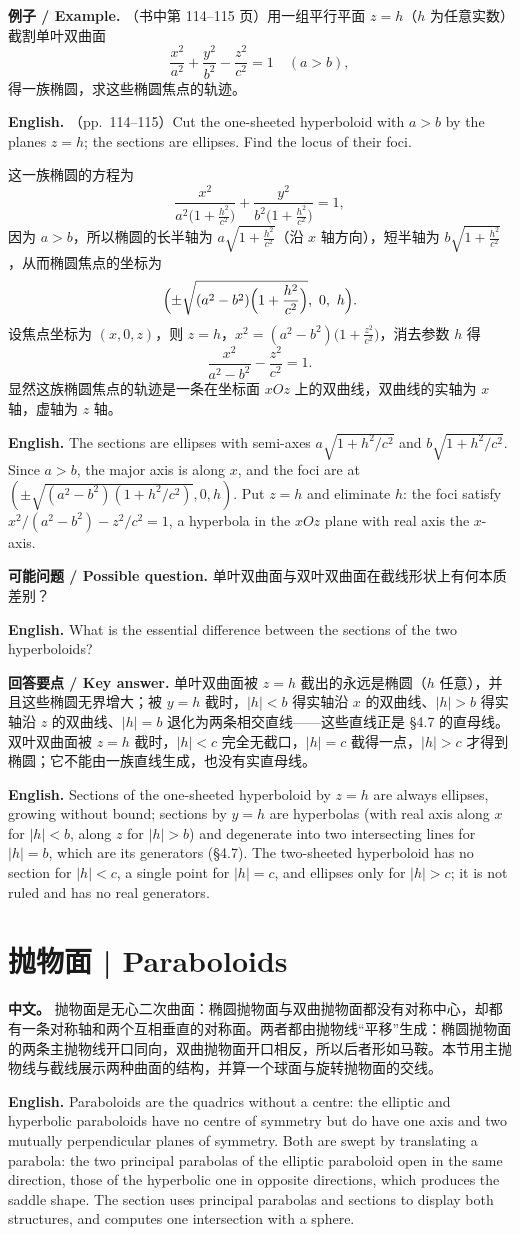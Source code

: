 \documentclass[UTF8,11pt,a4paper]{ctexart}
\newcommand{\APS}[2]{\par\noindent\textbf{中文。} #1\par\noindent\textbf{English.} #2\par\smallskip}
\newcommand{\EN}[1]{\par\noindent \textbf{English.} #1\par}
\newcommand{\EX}[2]{\par\noindent \textbf{例子 / Example.} #1\par\EN{#2}}
\newcommand{\ASK}[4]{\par\noindent \textbf{可能问题 / Possible question.} #1\par\EN{#2}\noindent \textbf{回答要点 / Key answer.} #3\par\EN{#4}\medskip}
\theoremstyle{definition}
\begin{document}
\EX{（书中第 114--115 页）用一组平行平面 $z=h$（$h$ 为任意实数）截割单叶双曲面
\[
\frac{x^2}{a^2}+\frac{y^2}{b^2}-\frac{z^2}{c^2}=1\quad(a>b),
\]
得一族椭圆，求这些椭圆焦点的轨迹。}{（pp.~114--115）Cut the one-sheeted hyperboloid with $a>b$ by the planes $z=h$; the sections are ellipses. Find the locus of their foci.}
这一族椭圆的方程为
\[
\frac{x^2}{a^2\bigl(1+\frac{h^2}{c^2}\bigr)}+\frac{y^2}{b^2\bigl(1+\frac{h^2}{c^2}\bigr)}=1,
\]
因为 $a>b$，所以椭圆的长半轴为 $a\sqrt{1+\frac{h^2}{c^2}}$（沿 $x$ 轴方向），短半轴为 $b\sqrt{1+\frac{h^2}{c^2}}$，从而椭圆焦点的坐标为
\[
\Bigl(\pm\sqrt{(a^2-b^2)\Bigl(1+\frac{h^2}{c^2}\Bigr)},\ 0,\ h\Bigr).
\]
设焦点坐标为 $(x,0,z)$，则 $z=h$，$x^2=(a^2-b^2)\bigl(1+\frac{z^2}{c^2}\bigr)$，消去参数 $h$ 得
\[
\frac{x^2}{a^2-b^2}-\frac{z^2}{c^2}=1.
\]
显然这族椭圆焦点的轨迹是一条在坐标面 $xOz$ 上的双曲线，双曲线的实轴为 $x$ 轴，虚轴为 $z$ 轴。
\EN{The sections are ellipses with semi-axes $a\sqrt{1+h^2/c^2}$ and $b\sqrt{1+h^2/c^2}$. Since $a>b$, the major axis is along $x$, and the foci are at $(\pm\sqrt{(a^2-b^2)(1+h^2/c^2)},0,h)$. Put $z=h$ and eliminate $h$: the foci satisfy $x^2/(a^2-b^2)-z^2/c^2=1$, a hyperbola in the $xOz$ plane with real axis the $x$-axis.}

\ASK{单叶双曲面与双叶双曲面在截线形状上有何本质差别？}{What is the essential difference between the sections of the two hyperboloids?}{单叶双曲面被 $z=h$ 截出的永远是椭圆（$h$ 任意），并且这些椭圆无界增大；被 $y=h$ 截时，$|h|<b$ 得实轴沿 $x$ 的双曲线、$|h|>b$ 得实轴沿 $z$ 的双曲线、$|h|=b$ 退化为两条相交直线——这些直线正是 §4.7 的直母线。双叶双曲面被 $z=h$ 截时，$|h|<c$ 完全无截口，$|h|=c$ 截得一点，$|h|>c$ 才得到椭圆；它不能由一族直线生成，也没有实直母线。}{Sections of the one-sheeted hyperboloid by $z=h$ are always ellipses, growing without bound; sections by $y=h$ are hyperbolas (with real axis along $x$ for $|h|<b$, along $z$ for $|h|>b$) and degenerate into two intersecting lines for $|h|=b$, which are its generators (§4.7). The two-sheeted hyperboloid has no section for $|h|<c$, a single point for $|h|=c$, and ellipses only for $|h|>c$; it is not ruled and has no real generators.}

\section{\label{sec:6}抛物面 | Paraboloids}
\APS{抛物面是无心二次曲面：椭圆抛物面与双曲抛物面都没有对称中心，却都有一条对称轴和两个互相垂直的对称面。两者都由抛物线``平移''生成：椭圆抛物面的两条主抛物线开口同向，双曲抛物面开口相反，所以后者形如马鞍。本节用主抛物线与截线展示两种曲面的结构，并算一个球面与旋转抛物面的交线。}{Paraboloids are the quadrics without a centre: the elliptic and hyperbolic paraboloids have no centre of symmetry but do have one axis and two mutually perpendicular planes of symmetry. Both are swept by translating a parabola: the two principal parabolas of the elliptic paraboloid open in the same direction, those of the hyperbolic one in opposite directions, which produces the saddle shape. The section uses principal parabolas and sections to display both structures, and computes one intersection with a sphere.}
\end{document}
